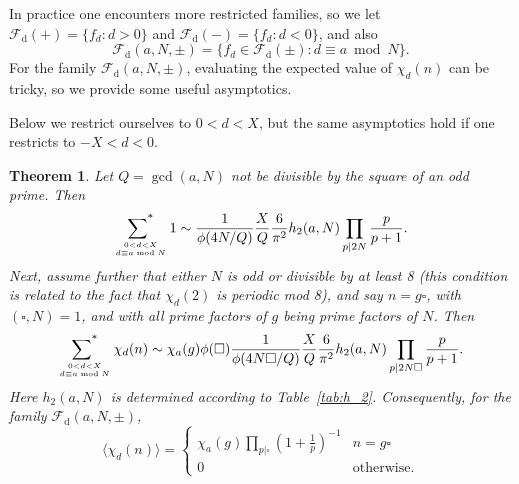 \documentclass[12pt,letterpaper]{amsart}
\theoremstyle{plain}
\newtheorem{theorem}{Theorem}[section]
\theoremstyle{definition}
\theoremstyle{remark}
\numberwithin{equation}{subsection}
\numberwithin{theorem}{subsection}
\numberwithin{table}{subsection}
\newcommand{\ontop}[2]{\genfrac{}{}{0pt}{}{#1}{#2}}
\def\sumstar{\operatornamewithlimits{\sum\nolimits^*}}
\begin{document}
In practice one encounters more restricted families, so 
we let ${\mathcal F}_{\text{d}}(+)=\{f_d:d>0\}$ and 
${\mathcal F}_{\text{d}}(-)=\{f_d:d<0\}$,
and also
\begin{equation}{\mathcal F}_{\text{d}}(a,N,\pm)=
\{f_d\in {\mathcal F}_{\text{d}}(\pm):d \equiv a \bmod N\}.
\end{equation}
For the family ${\mathcal F}_{\text{d}}(a,N,\pm)$, 
evaluating the expected value of $\chi_d(n)$ can be tricky, so
we provide some useful asymptotics.

Below we restrict ourselves to $0 < d < X$, but the same
asymptotics hold if one restricts to $-X < d < 0$. 

\begin{theorem}\label{thm:funddisc}
Let $Q=\gcd(a,N)$ not be divisible by the square of an odd prime. Then
\begin{equation}
\label{eqn:fund discr progressions}
    \sumstar_{\ontop{0 < d < X}{d \equiv a \bmod N}} 1
    \sim \frac{1}{\phi(4N/Q)} \frac{X}{Q} \frac{6}{\pi^2}
    h_2(a,N)
    \prod_{p|2N} \frac{p}{p+1}.
\end{equation}
Next, assume further that either $N$ is odd or divisible by at least 8
(this condition is related to the fact that $\chi_d(2)$ is
periodic mod 8), and say
$n=g\square$, with  $( \square,N)=1$, and  with all prime factors of 
$g$ being prime factors of $N$. Then 
\begin{equation}
    \label{eqn:chi over fund discr}
    \sumstar_{\ontop{0 < d < X}{d \equiv a \bmod N}} \chi_d(n)
    \sim
    \chi_a(g)  \phi(\square)
    \frac{1}{\phi(4N\square/Q)} \frac{X}{Q} \frac{6}{\pi^2}
    h_2(a,N)
    \prod_{p|2N\square} \frac{p}{p+1}.
\end{equation}
Here $h_2(a,N)$ is determined according to Table~\ref{tab:h_2}.
Consequently,
for the family ${\mathcal F}_{\text{d}}(a,N,\pm)$,
\begin{equation} 
    \label{eqn:chidaverage}
    \langle  \chi_d(n) \rangle = 
    \begin{cases} \chi_a(g) \prod_{p| \square} (1+\frac1p)^{-1}
    & n= g \square \\
    0& \text{otherwise}.
    \end{cases} 
\end{equation}
\end{theorem}
\end{document}
